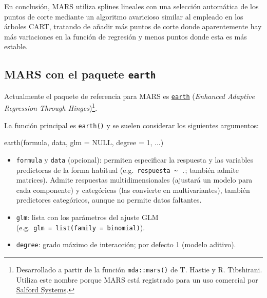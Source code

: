 \documentclass[
  spanish,
]{book}
\newenvironment{Shaded}{\begin{snugshade}}{\end{snugshade}}
\newcommand{\AttributeTok}[1]{\textcolor[rgb]{0.77,0.63,0.00}{#1}}
\newcommand{\ConstantTok}[1]{\textcolor[rgb]{0.00,0.00,0.00}{#1}}
\newcommand{\DecValTok}[1]{\textcolor[rgb]{0.00,0.00,0.81}{#1}}
\newcommand{\FunctionTok}[1]{\textcolor[rgb]{0.00,0.00,0.00}{#1}}
\newcommand{\NormalTok}[1]{#1}
\theoremstyle{break}
\theoremstyle{definition}
\theoremstyle{definition}
\theoremstyle{definition}
\theoremstyle{definition}
\theoremstyle{remark}
\begin{document}
En conclusión, MARS utiliza splines lineales con una selección automática de los puntos de corte mediante un algoritmo avaricioso similar al empleado en los árboles CART, tratando de añadir más puntos de corte donde aparentemente hay más variaciones en la función de regresión y menos puntos donde esta es más estable.

\hypertarget{mars-con-el-paquete-earth}{%
\subsection{\texorpdfstring{MARS con el paquete \texttt{earth}}{MARS con el paquete earth}}\label{mars-con-el-paquete-earth}}

Actualmente el paquete de referencia para MARS es \href{http://www.milbo.users.sonic.net/earth}{\texttt{earth}} (\emph{Enhanced Adaptive Regression Through Hinges})\footnote{Desarrollado a partir de la función \texttt{mda::mars()} de T. Hastie y R. Tibshirani. Utiliza este nombre porque MARS está registrado para un uso comercial por \href{https://www.salford-systems.com}{Salford Systems}.}.

La función principal es \texttt{earth()} y se suelen considerar los siguientes argumentos:

\begin{Shaded}
\begin{Highlighting}[]
\FunctionTok{earth}\NormalTok{(formula, data, }\AttributeTok{glm =} \ConstantTok{NULL}\NormalTok{, }\AttributeTok{degree =} \DecValTok{1}\NormalTok{, ...) }
\end{Highlighting}
\end{Shaded}

\begin{itemize}
\item
  \texttt{formula} y \texttt{data} (opcional): permiten especificar la respuesta y las variables predictoras de la forma habitual (e.g.~\texttt{respuesta\ \textasciitilde{}\ .}; también admite matrices). Admite respuestas multidimensionales (ajustará un modelo para cada componente) y categóricas (las convierte en multivariantes), también predictores categóricos, aunque no permite datos faltantes.
\item
  \texttt{glm}: lista con los parámetros del ajuste GLM (e.g.~\texttt{glm\ =\ list(family\ =\ binomial)}).
\item
  \texttt{degree}: grado máximo de interacción; por defecto 1 (modelo aditivo).
\end{itemize}
\end{document}
